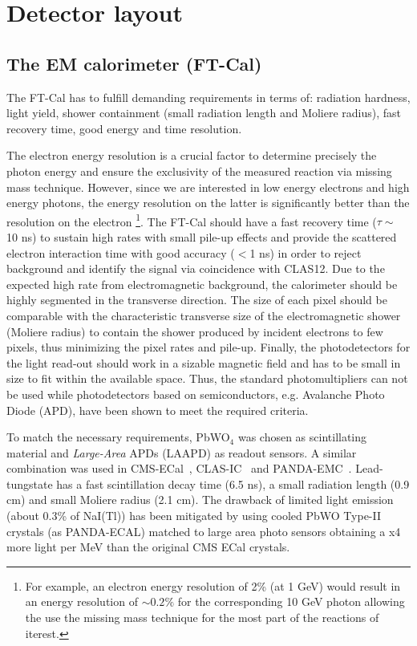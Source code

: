 \section{Detector layout}
\subsection{The EM calorimeter (FT-Cal)}

The FT-Cal has to  fulfill demanding requirements in terms of:  radiation hardness, light yield, shower containment (small radiation length and Moliere radius), fast recovery time, good energy and time resolution.

The electron energy resolution is a crucial factor to determine precisely the photon energy and ensure the exclusivity of the measured reaction via missing mass technique. However, since we are interested in low energy electrons and high energy photons, the energy resolution on the latter is significantly better than the resolution on the electron
\footnote {For example, an electron energy resolution of 2\% (at 1 GeV) would result in an energy resolution of $\sim 0.2 \%$ for the corresponding 10 GeV photon allowing  the use the missing mass technique for the most part of the  reactions of iterest.}.  
The FT-Cal should  have a fast recovery time ($\tau\sim$ 10 ns) to sustain high rates with small pile-up effects and provide the scattered electron interaction time with good accuracy ($<$1 ns) in order to reject background and identify the signal via coincidence with CLAS12. Due to the expected high rate from electromagnetic background, the calorimeter should be highly segmented in the transverse direction. The size of each pixel
should be comparable with the characteristic transverse size of the electromagnetic shower (Moliere radius) to contain the  shower produced  by incident electrons to few pixels, thus minimizing the pixel rates and pile-up. 
Finally, the photodetectors for the light read-out should work  in a sizable magnetic field and has to be small in size to fit within the available space. Thus, the  standard photomultipliers can not be used  while photodetectors based on semiconductors, e.g. Avalanche Photo Diode (APD),   have been shown to meet the required criteria. 

To match the necessary requirements,  PbWO$_4$  was chosen as scintillating material and  {\it Large-Area} APDs (LAAPD) as readout sensors. A similar  combination was used in CMS-ECal~\cite{CMS}, CLAS-IC~\cite{ic} and PANDA-EMC~\cite{panda_ecal}. Lead-tungstate has a fast scintillation decay time (6.5 ns), a  small radiation length (0.9 cm) and  small Moliere radius (2.1 cm). The drawback of  limited light emission (about 0.3\% of NaI(Tl)) has been mitigated by using cooled PbWO Type-II crystals (as PANDA-ECAL) matched  to large area photo sensors obtaining a x4 more light per MeV than the original CMS ECal crystals.

